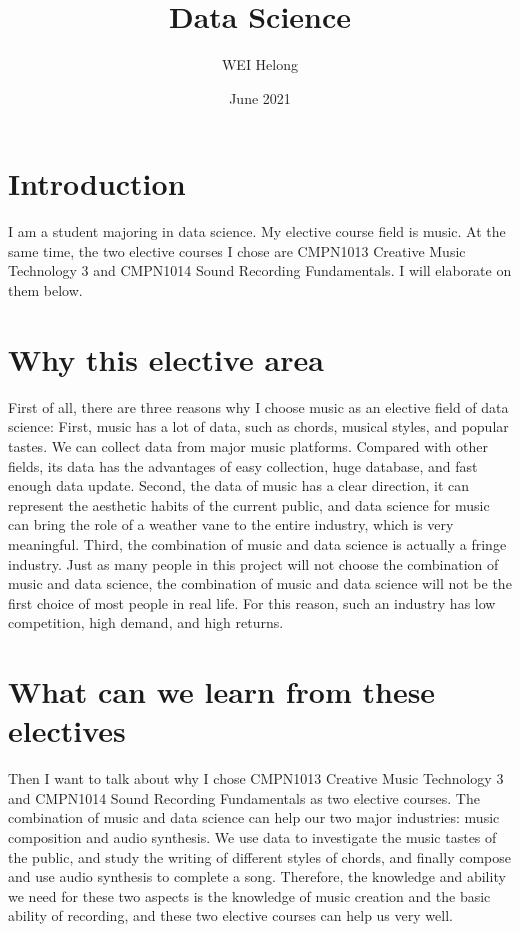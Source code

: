 \documentclass{article}
\title{Data Science}
\author{WEI Helong }
\date{June 2021}
\begin{document}
\maketitle

\section{Introduction}
I am a student majoring in data science. My elective course field is music. At the same time, the two elective courses I chose are CMPN1013 Creative Music Technology 3 and CMPN1014 Sound Recording Fundamentals. I will elaborate on them below.
\section{Why this elective area}
First of all, there are three reasons why I choose music as an elective field of data science: First, music has a lot of data, such as chords, musical styles, and popular tastes. We can collect data from major music platforms. Compared with other fields, its data has the advantages of easy collection, huge database, and fast enough data update. Second, the data of music has a clear direction, it can represent the aesthetic habits of the current public, and data science for music can bring the role of a weather vane to the entire industry, which is very meaningful. Third, the combination of music and data science is actually a fringe industry. Just as many people in this project will not choose the combination of music and data science, the combination of music and data science will not be the first choice of most people in real life. For this reason, such an industry has low competition, high demand, and high returns.
\section{What can we learn from these electives}
Then I want to talk about why I chose CMPN1013 Creative Music Technology 3 and CMPN1014 Sound Recording Fundamentals as two elective courses. The combination of music and data science can help our two major industries: music composition and audio synthesis. We use data to investigate the music tastes of the public, and study the writing of different styles of chords, and finally compose and use audio synthesis to complete a song. Therefore, the knowledge and ability we need for these two aspects is the knowledge of music creation and the basic ability of recording, and these two elective courses can help us very well.
\end{document}
